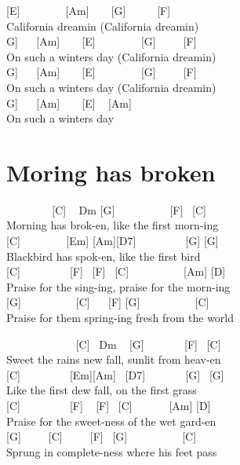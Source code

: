 \documentclass[
  letterpaper,
  twoside=false]{scrbook}
\begin{document}
{[}E{]} ~ ~ ~ ~ ~{[}Am{]} ~ ~ {[}G{]} ~ ~ ~ {[}F{]}\\
California dreamin (California dreamin\textquotesingle)\\
\hspace*{0.333em}{[}G{]} ~ ~{[}Am{]} ~ ~ {[}E{]} ~ ~ ~ ~ ~{[}G{]} ~ ~
~{[}F{]}\\
On such a winter\textquotesingle s day (California
dreamin\textquotesingle)\\
\hspace*{0.333em}{[}G{]} ~ ~{[}Am{]} ~ ~ {[}E{]} ~ ~ ~ ~ ~{[}G{]} ~ ~
~{[}F{]}\\
On such a winter\textquotesingle s day (California
dreamin\textquotesingle)\\
\hspace*{0.333em}{[}G{]} ~ ~{[}Am{]} ~ ~ {[}E{]} ~ {[}Am{]}\\
On such a winter\textquotesingle s day

\hypertarget{moring-has-broken}{%
\chapter{Moring has broken}\label{moring-has-broken}}

~ ~ ~ ~ ~ {[}C{]} ~ Dm {[}G{]} ~ ~ ~ ~ ~ ~{[}F{]} ~{[}C{]}\\
Morning has brok-en, like the first morn-ing\\
{[}C{]} ~ ~ ~ ~ ~{[}Em{]} {[}Am{]}{[}D7{]} ~ ~ ~ ~ ~ {[}G{]} {[}G{]}\\
Blackbird has spok-en, like the first bird\\
{[}C{]} ~ ~ ~ ~ ~ {[}F{]} ~{[}F{]} ~{[}C{]} ~ ~ ~ ~ ~ ~{[}Am{]}
{[}D{]}\\
Praise for the sing-ing, praise for the morn-ing\\
{[}G{]} ~ ~ ~ ~ ~ ~{[}C{]} ~ ~{[}F{]} {[}G{]} ~ ~ ~ ~ ~ ~{[}C{]}\\
Praise for them spring-ing fresh from the world

~ ~ ~ ~ ~ ~ ~ ~{[}C{]} ~Dm ~ {[}G{]} ~ ~ ~ ~ {[}F{]} ~{[}C{]}\\
Sweet the rain\textquotesingle s new fall, sunlit from heav-en\\
{[}C{]} ~ ~ ~ ~ ~ {[}Em{]}{[}Am{]} ~{[}D7{]} ~ ~ ~ ~ {[}G{]} ~{[}G{]}\\
Like the first dew fall, on the first grass\\
{[}C{]} ~ ~ ~ ~ ~ {[}F{]} ~ {[}F{]} ~{[}C{]} ~ ~ ~ ~{[}Am{]} {[}D{]}\\
Praise for the sweet-ness of the wet gard-en\\
{[}G{]} ~ ~ ~{[}C{]} ~ ~ ~{[}F{]} ~{[}G{]} ~ ~ ~ ~ ~ ~{[}C{]}\\
Sprung in complete-ness where his feet pass
\end{document}

